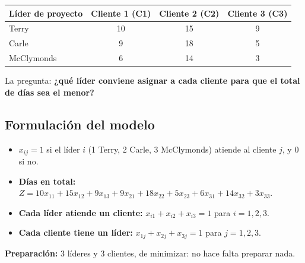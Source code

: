 \documentclass[11pt,a4paper]{article}
\begin{document}
\begin{center}\small
\begin{tabular}{lccc}
\toprule
\textbf{Líder de proyecto} & \textbf{Cliente 1 (C1)} & \textbf{Cliente 2 (C2)} & \textbf{Cliente 3 (C3)} \\
\midrule
Terry      & 10 & 15 & 9 \\
Carle      & 9  & 18 & 5 \\
McClymonds & 6  & 14 & 3 \\
\bottomrule
\end{tabular}
\end{center}

La pregunta: \textbf{¿qué líder conviene asignar a cada cliente para que el total de días sea el menor?}

\subsection*{Formulación del modelo}
\begin{itemize}[itemsep=2pt]
  \item $x_{ij} = 1$ si el líder $i$ (1 Terry, 2 Carle, 3 McClymonds) atiende al cliente $j$, y $0$ si no.
  \item \textbf{Días en total:} $Z = 10x_{11} + 15x_{12} + 9x_{13} + 9x_{21} + 18x_{22} + 5x_{23} + 6x_{31} + 14x_{32} + 3x_{33}$.
  \item \textbf{Cada líder atiende un cliente:} $x_{i1} + x_{i2} + x_{i3} = 1$ para $i = 1, 2, 3$.
  \item \textbf{Cada cliente tiene un líder:} $x_{1j} + x_{2j} + x_{3j} = 1$ para $j = 1, 2, 3$.
\end{itemize}
\textbf{Preparación:} 3 líderes y 3 clientes, de minimizar: no hace falta preparar nada.
\end{document}
